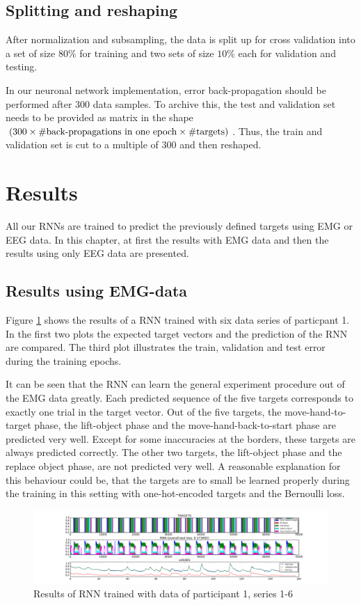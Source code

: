 \documentclass{article} %
\begin{document}
\subsection{Splitting and reshaping}
After normalization and subsampling, the data is split up for cross validation into a set of size $80\%$ for training and two sets of size $10\%$ each for validation and testing.

In our neuronal network implementation, error back-propagation should be performed after 300 data samples. To archive this, the test and validation set needs to be provided as matrix in the shape $(300 \times \# \textnormal{back-propagations in one epoch} \times \# \textnormal{targets)}$. Thus, the train and validation set is cut to a multiple of 300 and then reshaped.

\section{Results}
All our RNNs are trained to predict the previously defined targets using EMG or EEG data. In this chapter, at first the results with EMG data and then the results using only EEG data are presented.
\subsection{Results using EMG-data}
Figure \ref{fig:emg_RNN_1} shows the results of a RNN trained with six data series of particpant 1. In the first two plots the expected target vectors and the prediction of the RNN are compared. The third plot illustrates the train, validation and test error during the training epochs.

It can be seen that the RNN can learn the general experiment procedure out of the EMG data greatly. Each predicted sequence of the five targets corresponds to exactly one trial in the target vector. Out of the five targets, the move-hand-to-target phase, the lift-object phase and the move-hand-back-to-start phase are predicted very well. Except for some inaccuracies at the borders, these targets are always predicted correctly. The other two targets, the lift-object phase and the replace object phase, are not predicted very well. A reasonable explanation for this behaviour could be, that the targets are to small be learned properly during the training in this setting with one-hot-encoded targets and the Bernoulli loss.
\begin{figure}
	\centering
	\includegraphics[width=1.0\textwidth]{images/EMG-results_participant_1_series1-6.png}
	\caption{Results of RNN trained with data of participant 1, series 1-6}
	\label{fig:emg_RNN_1}
\end{figure}
\end{document}
